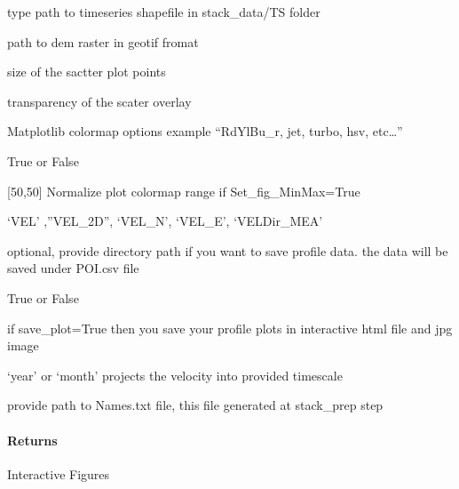 \documentclass[letterpaper,10pt,english]{sphinxmanual}
\begin{document}
\begin{fulllineitems}
\begin{description}
\sphinxAtStartPar
type path to timeseries shapefile in stack\_data/TS folder

\sphinxAtStartPar
path to dem raster in geotif fromat

\sphinxAtStartPar
size of the sactter plot points

\sphinxAtStartPar
transparency of the scater overlay

\sphinxAtStartPar
Matplotlib colormap options example “RdYlBu\_r, jet, turbo, hsv, etc…”

\sphinxAtStartPar
True or False

\sphinxAtStartPar
{[}\sphinxhyphen{}50,50{]}  Normalize plot colormap range if Set\_fig\_MinMax=True

\sphinxAtStartPar
‘VEL’ ,”VEL\_2D”, ‘VEL\_N’, ‘VEL\_E’, ‘VELDir\_MEA’

\sphinxAtStartPar
optional, provide directory path if you want to save profile data.
the data will be saved under POI.csv file

\sphinxAtStartPar
True or False

\sphinxAtStartPar
if save\_plot=True then
you save your profile plots in interactive html file and jpg image

\sphinxAtStartPar
‘year’ or ‘month’ projects the velocity into provided time\sphinxhyphen{}scale

\sphinxAtStartPar
provide path to Names.txt file, this file generated at stack\_prep step

\end{description}


\paragraph{Returns}
\label{\detokenize{akhdefo_functions:id2}}
\sphinxAtStartPar
Interactive Figures

\end{fulllineitems}

\end{document}
